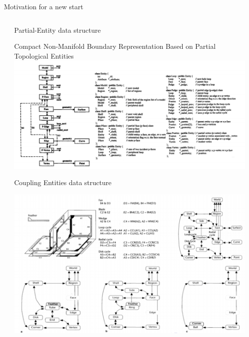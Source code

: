 \begin{frame}[plain]{Motivation for a new start}
\begin{columns}[T]
\begin{column}{0.48\textwidth}
    \end{column}
    
    \begin{column}{0.48\textwidth}
    {\small Partial-Entity data structure \cite{SangHunLee2001}}
    
    {\scriptsize
    Compact Non-Manifold Boundary Representation Based on Partial
    Topological Entities
    }
    \includegraphics[width=0.98\textwidth]{figs/SangHunLee2001_partial_entity.png}~
    
    
    {\small Coupling Entities data structure
    \cite{yamaguchi1995nonmanifold}}
    
    \includegraphics[width=0.98\textwidth]{figs/yamaguchi1995nonmanifold.png}~
    
    \end{column}
    \end{columns}
    
    \end{frame}



